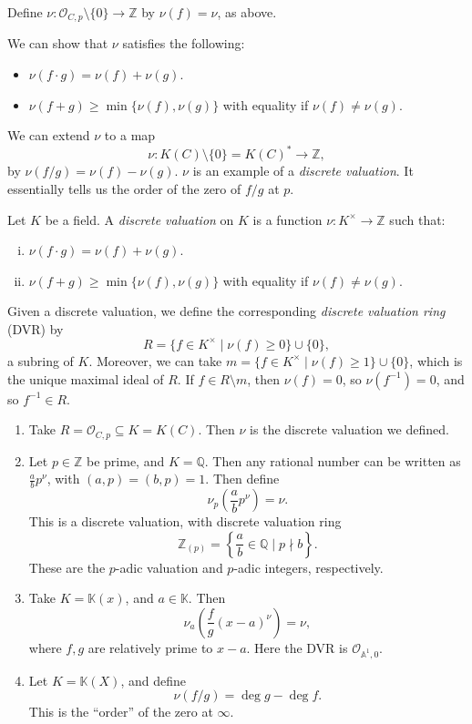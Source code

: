 \documentclass[12pt]{article}
\begin{document}
\begin{definition}
	Define $\nu : \mathcal{O}_{C, p} \setminus \{0\} \to \mathbb{Z}$ by $\nu(f) = \nu$, as above.
\end{definition}

We can show that $\nu$ satisfies the following:
\begin{itemize}
	\item $\nu(f \cdot g) = \nu(f) + \nu(g)$.
	\item $\nu(f + g) \geq \min\{\nu(f), \nu(g)\}$ with equality if  $\nu(f) \neq \nu(g)$.
\end{itemize}
We can extend $\nu$ to a map
\[
	\nu : K(C) \setminus \{0\} = K(C)^\ast \to \mathbb{Z},
\]
by $\nu(f/g) = \nu(f) - \nu(g)$. $\nu$ is an example of a \emph{discrete valuation}. It essentially tells us the order of the zero of $f/g$ at $p$.

\begin{definition}
	Let $K$ be a field. A \emph{discrete valuation} on $K$ is a function $\nu : K^\times \to \mathbb{Z}$ such that:
	\begin{enumerate}[(i)]
		\item $\nu(f \cdot g) =\nu(f) + \nu(g)$.
		\item $\nu(f + g) \geq \min\{\nu(f), \nu(g)\}$ with equality if $\nu(f) \neq \nu(g)$.
	\end{enumerate}
	Given a discrete valuation, we define the corresponding \emph{discrete valuation ring} (DVR) by
	\[
		R = \{f \in K^\times \mid \nu(f) \geq 0\} \cup \{0\},
	\]
	a subring of $K$. Moreover, we can take $m = \{f \in K^\times \mid \nu(f) \geq 1\} \cup \{0\}$, which is the unique maximal ideal of $R$. If $f \in R \setminus m$, then $\nu(f) = 0$, so $\nu(f^{-1}) = 0$, and so $f^{-1} \in R$.
\end{definition}

\begin{exbox}
	\begin{enumerate}
		\item Take $R = \mathcal{O}_{C, p} \subseteq K = K(C)$. Then $\nu$ is the discrete valuation we defined.
		\item Let $p \in \mathbb{Z}$ be prime, and $K = \mathbb{Q}$. Then any rational number can be written as $\frac{a}{b} p^\nu$, with $(a, p) = (b, p) = 1$. Then define
			\[
			\nu_p \left( \frac{a}{b} p^\nu\right) = \nu.
			\]
			This is a discrete valuation, with discrete valuation ring
			\[
				\mathbb{Z}_{(p)} = \left\{ \frac{a}{b} \in \mathbb{Q} \mid p \nmid b \right\}.
			\]
			These are the $p$-adic valuation and $p$-adic integers, respectively.
		\item Take $K = \mathbb{K}(x)$, and $a \in \mathbb{K}$. Then
			\[
			\nu_a \left( \frac{f}{g} (x - a)^\nu \right) = \nu,
			\]
			where $f, g$ are relatively prime to $x-a$. Here the DVR is $\mathcal{O}_{\mathbb{A}^1, 0}$.
		\item Let $K = \mathbb{K}(X)$, and define
			\[
			\nu(f/g) = \deg g - \deg f.
			\]
			This is the ``order'' of the zero at $\infty$.
	\end{enumerate}
\end{exbox}
\end{document}
